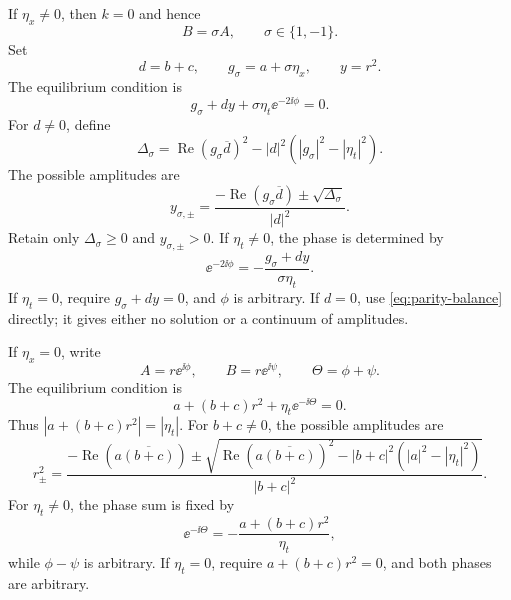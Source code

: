 If $\eta_x\neq0$, then $k=0$ and hence
\begin{equation}
 B=\sigma A,
 \qquad
 \sigma\in\{1,-1\}.
 \label{eq:parity-state}
\end{equation}
Set
\[
 d=b+c,
 \qquad
 g_\sigma=a+\sigma\eta_x,
 \qquad
 y=r^2.
\]
The equilibrium condition is
\begin{equation}
 g_\sigma+dy+\sigma\eta_t\ee^{-2\ii\phi}=0.
 \label{eq:parity-balance}
\end{equation}
For $d\neq0$, define
\begin{equation}
 \Delta_\sigma=
 \operatorname{Re}(g_\sigma\overline d)^2
 -|d|^2\left(|g_\sigma|^2-|\eta_t|^2\right).
 \label{eq:parity-discriminant}
\end{equation}
The possible amplitudes are
\begin{equation}
 y_{\sigma,\pm}=
 \frac{-\operatorname{Re}(g_\sigma\overline d)
       \pm\sqrt{\Delta_\sigma}}{|d|^2}.
 \label{eq:parity-amplitudes}
\end{equation}
Retain only $\Delta_\sigma\geq0$ and $y_{\sigma,\pm}>0$.  If
$\eta_t\neq0$, the phase is determined by
\begin{equation}
 \ee^{-2\ii\phi}
 =-\frac{g_\sigma+dy}{\sigma\eta_t}.
 \label{eq:parity-phase}
\end{equation}
If $\eta_t=0$, require $g_\sigma+dy=0$, and $\phi$ is arbitrary.  If
$d=0$, use \eqref{eq:parity-balance} directly; it gives either no solution
or a continuum of amplitudes.

If $\eta_x=0$, write
\[
 A=r\ee^{\ii\phi},
 \qquad
 B=r\ee^{\ii\psi},
 \qquad
 \Theta=\phi+\psi.
\]
The equilibrium condition is
\begin{equation}
 a+(b+c)r^2+\eta_t\ee^{-\ii\Theta}=0.
 \label{eq:temporal-equal-balance}
\end{equation}
Thus $|a+(b+c)r^2|=|\eta_t|$.  For $b+c\neq0$, the possible amplitudes are
\begin{equation}
 r_\pm^2=
 \frac{-\operatorname{Re}\!\left(a\overline{(b+c)}\right)
 \pm\sqrt{
 \operatorname{Re}\!\left(a\overline{(b+c)}\right)^2
 -|b+c|^2\left(|a|^2-|\eta_t|^2\right)}}{|b+c|^2}.
 \label{eq:temporal-equal-amplitudes}
\end{equation}
For $\eta_t\neq0$, the phase sum is fixed by
\begin{equation}
 \ee^{-\ii\Theta}
 =-\frac{a+(b+c)r^2}{\eta_t},
 \label{eq:temporal-equal-phase}
\end{equation}
while $\phi-\psi$ is arbitrary.  If $\eta_t=0$, require
$a+(b+c)r^2=0$, and both phases are arbitrary.


